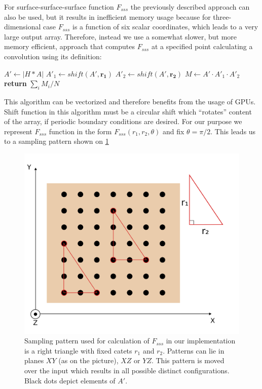\documentclass[preprint]{elsarticle}
\begin{document}
For surface-surface-surface function $F_{sss}$ the previously described approach
can also be used, but it results in inefficient memory usage because for
three-dimensional case $F_{sss}$ is a function of six scalar coordinates, which
leads to a very large output array. Therefore, instead we use a somewhat slower,
but more memory efficient, approach that computes $F_{sss}$ at a specified point
calculating a convolution using its definition:
\begin{algorithmic}[1]
  \State $A' \gets |H*A|$
  \State $A'_1 \gets shift(A', \bm{r_1})$
  \State $A'_2 \gets shift(A', \bm{r_2})$
  \State $M \gets A' \cdot A'_1 \cdot A'_2$
  \State \textbf{return} $\sum_{i} M_{i} / N$
  \EndProcedure
\end{algorithmic}
This algorithm can be vectorized and therefore benefits from the usage of
GPUs. Shift function in this algorithm must be a circular shift which
``rotates'' content of the array, if periodic boundary conditions are
desired. For our purpose we represent $F_{sss}$ function in the form
$F_{sss}(r_1, r_2, \theta)$ and fix $\theta = \pi/2$. This leads us to a
sampling pattern shown on \cref{fig:Fsss-pattern}
\begin{figure}
  \centering
  \includegraphics[width=0.8\linewidth]{images/pattern.png}
  \caption[]{Sampling pattern used for calculation of $F_{sss}$ in our
    implementation is a right triangle with fixed catets $r_1$ and $r_2$.
    Patterns can lie in planes $XY$ (as on the picture), $XZ$ or $YZ$. This
    pattern is moved over the input which results in all possible distinct
    configurations. Black dots depict elements of $A'$.}
  \label{fig:Fsss-pattern}
\end{figure}
\end{document}
